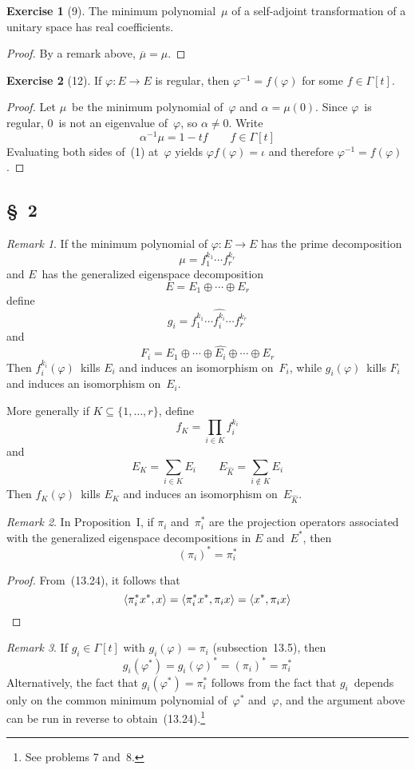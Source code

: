 \documentclass[letterpaper,12pt]{article}
\newcommand{\dsum}{\oplus}
\newcommand{\delete}{\widehat}
\newcommand{\sprod}[2]{\langle#1,#2\rangle}
\newcommand{\conj}[1]{\overline{#1}}
\newcommand{\multi}[4]{#2_{#3}#1\cdots#1#2_{#4}}
\newcommand{\dsums}[3]{\multi{\dsum}{#1}{#2}{#3}}
\theoremstyle{definition}
\newtheorem*{exer}{Exercise}
\theoremstyle{remark}
\newtheorem*{rmk}{Remark}
\begin{document}
\begin{exer}[9]
The minimum polynomial~\(\mu\) of a self-adjoint transformation of a unitary space has real coefficients.
\end{exer}
\begin{proof}
By a remark above, \(\conj{\mu}=\mu\).
\end{proof}

\begin{exer}[12]
If \(\varphi:E\to E\) is regular, then \(\varphi^{-1}=f(\varphi)\) for some \(f\in\Gamma[t]\).
\end{exer}
\begin{proof}
Let \(\mu\)~be the minimum polynomial of~\(\varphi\) and \(\alpha=\mu(0)\). Since \(\varphi\)~is regular, \(0\)~is not an eigenvalue of~\(\varphi\), so \(\alpha\ne0\). Write
\[\alpha^{-1}\mu=1-tf\qquad f\in\Gamma[t]\tag{1}\]
Evaluating both sides of~(1) at~\(\varphi\) yields \(\varphi f(\varphi)=\iota\) and therefore \(\varphi^{-1}=f(\varphi)\).
\end{proof}

\subsection*{\S~2}
\begin{rmk}
If the minimum polynomial of \(\varphi:E\to E\) has the prime decomposition
\[\mu=f_1^{k_1}\cdots f_r^{k_r}\]
and \(E\)~has the generalized eigenspace decomposition
\[E=\dsums{E}{1}{r}\]
define
\[g_i=f_1^{k_1}\cdots\delete{f_i^{k_i}}\cdots f_r^{k_r}\]
and
\[F_i=E_1\dsum\cdots\dsum\delete{E_i}\dsum\cdots\dsum E_r\]
Then \(f_i^{k_i}(\varphi)\)~kills \(E_i\) and induces an isomorphism on~\(F_i\), while \(g_i(\varphi)\)~kills \(F_i\) and induces an isomorphism on~\(E_i\).

More generally if \(K\subseteq\{1,\ldots,r\}\), define
\[f_K=\prod_{i\in K}f_i^{k_i}\]
and
\[E_K=\sum_{i\in K}E_i\qquad E_{\delete{K}}=\sum_{i\not\in K}E_i\]
Then \(f_K(\varphi)\)~kills \(E_K\) and induces an isomorphism on~\(E_{\delete{K}}\).
\end{rmk}

\begin{rmk}
In Proposition~I, if \(\pi_i\) and~\(\pi^*_i\) are the projection operators associated with the generalized eigenspace decompositions in \(E\) and~\(E^*\), then
\[(\pi_i)^*=\pi^*_i\]
\end{rmk}
\begin{proof}
From~(13.24), it follows that
\[\sprod{\pi^*_i x^*}{x}=\sprod{\pi^*_i x^*}{\pi_i x}=\sprod{x^*}{\pi_i x}\qedhere\]
\end{proof}
\begin{rmk}
If \(g_i\in\Gamma[t]\) with \(g_i(\varphi)=\pi_i\) (subsection~13.5), then
\[g_i(\varphi^*)=g_i(\varphi)^*=(\pi_i)^*=\pi^*_i\]
Alternatively, the fact that \(g_i(\varphi^*)=\pi^*_i\) follows from the fact that \(g_i\)~depends only on the common minimum polynomial of~\(\varphi^*\) and~\(\varphi\), and the argument above can be run in reverse to obtain~(13.24).\footnote{See problems 7 and~8.}
\end{rmk}
\end{document}
